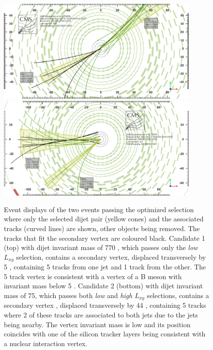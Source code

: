\begin{figure}
\centering
\includegraphics[width=0.9\textwidth]{plots/displays/candidate1_display.png}
\includegraphics[width=0.9\textwidth]{plots/displays/candidate2_display.png}

\caption{Event displays of the two events passing the optimized selection where only the selected dijet pair
 (yellow cones) and 
the associated tracks (curved lines) are shown, other objects being removed. The tracks that fit the secondary 
vertex are coloured black.  
Candidate 1 (top) with dijet invariant mass of 770 \GeV, which 
passes only the {\it low $L_{xy}$} selection, 
contains a secondary vertex, displaced transversely by 5 \cm, containing 5 tracks from one jet and 1 track
from the other. The 5 track vertex is consistent with a vertex of a B meson with invariant mass below 5 \GeV.
Candidate 2 (bottom) with dijet invariant mass of 75\GeV, 
which passes both {\it low} and {\it high $L_{xy}$} selections, contains a secondary vertex
, displaced transversely by 44 \cm, containing 5 tracks where 2 of these tracks are
associated to both jets due to the jets being nearby. The vertex invariant mass is low and its position
 coincides with one of the silicon 
tracker layers being consistent with a nuclear interaction vertex. \label{fig:eventDisplays}}
\end{figure} 



